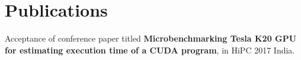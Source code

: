 \section{Publications}
\begin{itemize}[leftmargin=0.15in, label={}]
    \small{\item{Acceptance of conference paper titled \textbf{Microbenchmarking Tesla K20 GPU for estimating execution time of a CUDA program}, in HiPC 2017 India.}}
\end{itemize}

